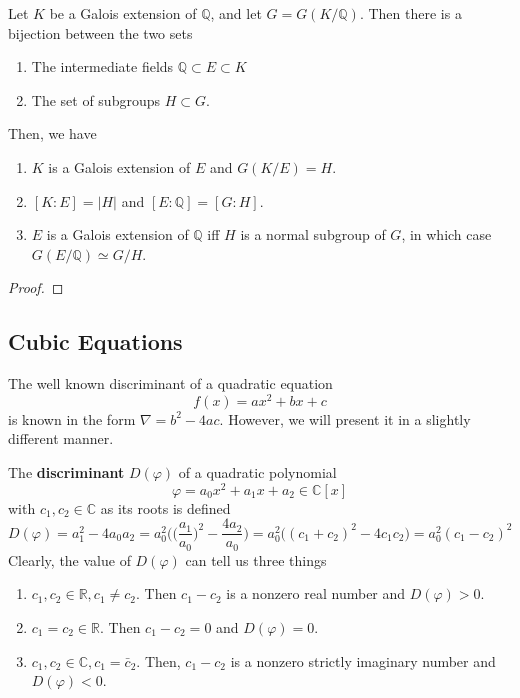   \begin{theorem}
    Let $K$ be a Galois extension of $\mathbb{Q}$, and let $G = G(K/\mathbb{Q})$. Then there is a bijection between the two sets
    \begin{enumerate}
      \item The intermediate fields $\mathbb{Q} \subset E \subset K$
      \item  The set of subgroups $H \subset G$. 
    \end{enumerate} 
    Then, we have 
    \begin{enumerate}
      \item $K$ is a Galois extension of $E$ and $G(K/E) = H$. 
      \item $[K:E] = |H|$ and $[E:\mathbb{Q}] = [G:H]$. 
      \item $E$ is a Galois extension of $\mathbb{Q}$ iff $H$ is a normal subgroup of $G$, in which case $G(E/\mathbb{Q}) \simeq G/H$. 
    \end{enumerate}
  \end{theorem}
  \begin{proof}
    
  \end{proof}

\subsection{Cubic Equations}

  The well known discriminant of a quadratic equation 
  \begin{equation}
    f(x) = ax^2 + bx + c
  \end{equation}
  is known in the form $\nabla = b^2 - 4ac$. However, we will present it in a slightly different manner. 

  \begin{definition}
    The \textbf{discriminant} $D(\varphi)$ of a quadratic polynomial
    \begin{equation}
      \varphi = a_0 x^2 + a_1 x + a_2 \in \mathbb{C}[x]
    \end{equation}
    with $c_1, c_2 \in \mathbb{C}$ as its roots is defined
    \begin{equation}
      D(\varphi) = a_1^2 - 4 a_0 a_2 = a_0^2 \bigg( \Big(\frac{a_1}{a_0} \Big)^2 - \frac{4 a_2}{a_0} \bigg) = a_0^2 \big( (c_1 + c_2)^2 - 4 c_1 c_2 \big) = a_0^2 (c_1 - c_2)^2
    \end{equation}
    Clearly, the value of $D(\varphi)$ can tell us three things
    \begin{enumerate}
      \item $c_1, c_2 \in \mathbb{R}, c_1 \neq c_2$. Then $c_1 - c_2$ is a nonzero real number and $D(\varphi) > 0$. 
      \item $c_1 = c_2 \in \mathbb{R}$. Then $c_1 - c_2 = 0$ and $D(\varphi) = 0$. 
      \item $c_1, c_2 \in \mathbb{C}, c_1 = \bar{c}_2$. Then, $c_1 - c_2$ is a nonzero strictly imaginary number and $D(\varphi) < 0$. 
    \end{enumerate}
  \end{definition}

